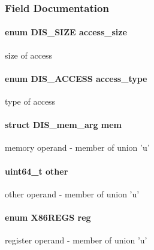 \subsubsection{Field Documentation}
\hypertarget{struct_d_i_s__arg_abe85ed51a3596cdb3a868a284c3d961f}{
\paragraph[{access\-\_\-size}]{\setlength{\rightskip}{0pt plus 5cm}enum {\bf D\-I\-S\-\_\-\-S\-I\-Z\-E} access\-\_\-size}}\label{struct_d_i_s__arg_abe85ed51a3596cdb3a868a284c3d961f}
size of access \hypertarget{struct_d_i_s__arg_a5a7d33b48f73c1d560377f10471d8b00}{
\paragraph[{access\-\_\-type}]{\setlength{\rightskip}{0pt plus 5cm}enum {\bf D\-I\-S\-\_\-\-A\-C\-C\-E\-S\-S} access\-\_\-type}}\label{struct_d_i_s__arg_a5a7d33b48f73c1d560377f10471d8b00}
type of access \hypertarget{struct_d_i_s__arg_a883edefb091b4875ffd7bb1f1e61dea3}{
\paragraph[{mem}]{\setlength{\rightskip}{0pt plus 5cm}struct {\bf D\-I\-S\-\_\-mem\-\_\-arg} mem}}\label{struct_d_i_s__arg_a883edefb091b4875ffd7bb1f1e61dea3}
memory operand -\/ member of union 'u' \hypertarget{struct_d_i_s__arg_aabf8b24bd58cc13ea953e9add24d4387}{
\paragraph[{other}]{\setlength{\rightskip}{0pt plus 5cm}uint64\-\_\-t other}}\label{struct_d_i_s__arg_aabf8b24bd58cc13ea953e9add24d4387}
other operand -\/ member of union 'u' \hypertarget{struct_d_i_s__arg_a426daf7e6de8cea3128731107457d2cf}{
\paragraph[{reg}]{\setlength{\rightskip}{0pt plus 5cm}enum {\bf X86\-R\-E\-G\-S} reg}}\label{struct_d_i_s__arg_a426daf7e6de8cea3128731107457d2cf}
register operand -\/ member of union 'u' 